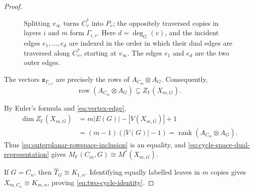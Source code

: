 \documentclass[10pt,a4paper]{amsart}
\providecommand{\F}{\mathbb F}
\DeclareMathOperator{\rank}{rank}
\DeclareMathOperator{\row}{row}
\numberwithin{equation}{section}
\theoremstyle{definition}
\theoremstyle{remark}
\begin{document}
\begin{proof}
\begin{figure}[!ht]
\caption{Splitting \(v_\infty\) turns \(C_v^*\) into \(P_v\);
the oppositely traversed copies in layers \(i\) and \(m\) form
\(\Gamma_{i,v}\).  Here \(d=\deg_G(v)\), and the incident edges
\(e_1,\ldots,e_d\) are indexed in the order in which their dual
edges are traversed along \(C_v^*\), starting at \(v_\infty\).
The edges \(e_1\) and \(e_d\) are the two outer edges.}
\label{fig:dual-path-cycle}
\end{figure}
The vectors \(\boldsymbol z_{\Gamma_{i,v}}\) are precisely the rows of \(A_{C_m}\otimes A_G\).  Consequently,
\begin{equation}\label{eq:outerplanar-rowspace-inclusion}
 \row(A_{C_m}\otimes A_G)\subseteq Z_{\F}(X_{m,G}).
\end{equation}

By Euler's formula and \eqref{eq:vertex-edge},
\[
 \begin{aligned}
 \dim Z_{\F}(X_{m,G})
 &=m|E(G)|-|V(X_{m,G})|+1\\
 &=(m-1)(|V(G)|-1)
 =\rank(A_{C_m}\otimes A_G).
 \end{aligned}
\]
Thus \eqref{eq:outerplanar-rowspace-inclusion} is an equality, and
\eqref{eq:cycle-space-dual-representation} gives
\(M_{\F}(C_m,G)\cong M^*(X_{m,G})\).

If \(G=C_n\), then \(\widehat T_G\cong K_{1,n}\).
Identifying equally labelled leaves in \(m\) copies gives
\(X_{m,C_n}\cong K_{m,n}\), proving
\eqref{eq:two-cycle-identity}.
\end{proof}
\end{document}
